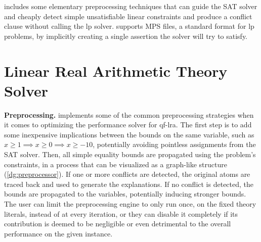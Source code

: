 \documentclass[runningheads]{llncs}
\begin{document}
\dlinear includes some elementary preprocessing techniques that can guide the SAT solver and cheaply detect simple unsatisfiable linear constraints and produce a conflict clause without calling the \gls{lp} solver.
\dlinear supports MPS files, a standard format for \gls{lp} problems, by implicitly creating a single assertion the solver will try to satisfy.

\section{Linear Real Arithmetic Theory Solver}
\label{sec:lra-theory-solver}


\smallskip
\noindent\textbf{Preprocessing.}
\dlinear implements some of the common preprocessing strategies when it comes to optimizing the performance solver for \gls{qf-lra}.
The first step is to add some inexpensive implications between the bounds on the same variable, such as $x \ge 1 \implies x \ge 0 \implies x \ge -10$, potentially avoiding pointless assignments from the SAT solver.
Then, all simple equality bounds are propagated using the problem's constraints, in a process that can be visualized as a graph-like structure (\autoref{dg:preprocessor}).
If one or more conflicts are detected, the original atoms are traced back and used to generate the explanations.
If no conflict is detected, the bounds are propagated to the variables, potentially inducing stronger bounds.
The user can limit the preprocessing engine to only run once, on the fixed theory literals, instead of at every iteration, or they can disable it completely if its contribution is deemed to be negligible or even detrimental to the overall performance on the given instance.
\end{document}
